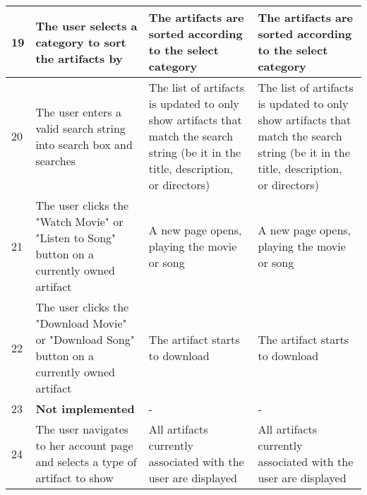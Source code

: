 {{\begin{tabular}{ | p{2cm} | p{3cm} | p{4cm} | p{4cm} | }
	\hline
	19 & The user selects a category to sort the artifacts by & The artifacts are sorted according to the select category & The artifacts are sorted according to the select category \\
	\hline
	20 & The user enters a valid search string into search box and searches & The list of artifacts is updated to only show artifacts that match the search string (be it in the title, description, or directors) & The list of artifacts is updated to only show artifacts that match the search string (be it in the title, description, or directors) \\
	\hline
	21 & The user clicks the "Watch Movie" or "Listen to Song" button on a currently owned artifact & A new page opens, playing the movie or song & A new page opens, playing the movie or song \\
	\hline
	22 & The user clicks the "Download Movie" or "Download Song" button on a currently owned artifact & The artifact starts to download & The artifact starts to download \\
	\hline
	23 & \textbf{Not implemented}  & - & - \\
	\hline
	24 & The user navigates to her account page and selects a type of artifact to show & All artifacts currently associated with the user are displayed & All artifacts currently associated with the user are displayed \\
	\hline
\end{tabular}}}
